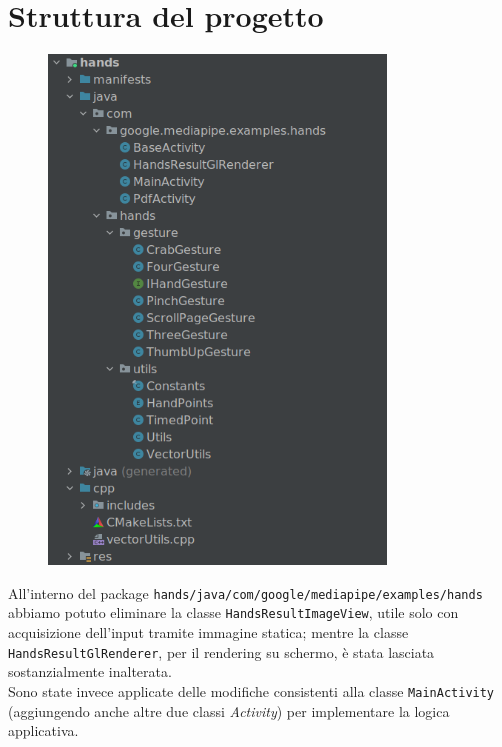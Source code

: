 \section{Struttura del progetto}
\begin{figure}[H]
    \centering
    \includegraphics[width=0.8\textwidth]{images/struct_progetto.png}
\end{figure}
All'interno del package \texttt{hands/java/com/google/mediapipe/examples/hands} abbiamo potuto eliminare la classe \texttt{HandsResultImageView}, utile solo con acquisizione dell'input tramite immagine statica; mentre la classe \texttt{HandsResultGlRenderer}, per il rendering su schermo, è stata lasciata sostanzialmente inalterata.\\
Sono state invece applicate delle modifiche consistenti alla classe \texttt{MainActivity} (aggiungendo anche altre due classi \textit{Activity}) per implementare la logica applicativa.\\


